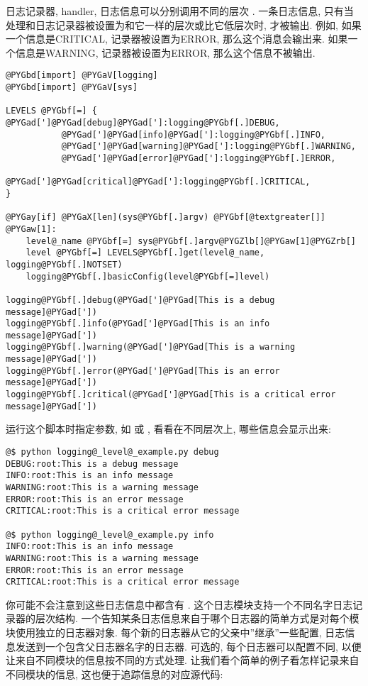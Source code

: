 \documentclass[letterpaper,10pt,english]{manual}
\begin{document}
日志记录器, handler, 日志信息可以分别调用不同的层次 . 一条日志信息, 只有当处理和日志记录器被设置为和它一样的层次或比它低层次时, 才被输出. 例如, 如果一个信息是CRITICAL, 记录器被设置为ERROR, 那么这个消息会输出来. 如果一个信息是WARNING, 记录器被设置为ERROR, 那么这个信息不被输出.

\begin{Verbatim}[commandchars=@\[\]]
@PYGbd[import] @PYGaV[logging]
@PYGbd[import] @PYGaV[sys]

LEVELS @PYGbf[=] { @PYGad[']@PYGad[debug]@PYGad[']:logging@PYGbf[.]DEBUG,
           @PYGad[']@PYGad[info]@PYGad[']:logging@PYGbf[.]INFO,
           @PYGad[']@PYGad[warning]@PYGad[']:logging@PYGbf[.]WARNING,
           @PYGad[']@PYGad[error]@PYGad[']:logging@PYGbf[.]ERROR,
           @PYGad[']@PYGad[critical]@PYGad[']:logging@PYGbf[.]CRITICAL,
}

@PYGay[if] @PYGaX[len](sys@PYGbf[.]argv) @PYGbf[@textgreater[]] @PYGaw[1]:
    level@_name @PYGbf[=] sys@PYGbf[.]argv@PYGZlb[]@PYGaw[1]@PYGZrb[]
    level @PYGbf[=] LEVELS@PYGbf[.]get(level@_name, logging@PYGbf[.]NOTSET)
    logging@PYGbf[.]basicConfig(level@PYGbf[=]level)

logging@PYGbf[.]debug(@PYGad[']@PYGad[This is a debug message]@PYGad['])
logging@PYGbf[.]info(@PYGad[']@PYGad[This is an info message]@PYGad['])
logging@PYGbf[.]warning(@PYGad[']@PYGad[This is a warning message]@PYGad['])
logging@PYGbf[.]error(@PYGad[']@PYGad[This is an error message]@PYGad['])
logging@PYGbf[.]critical(@PYGad[']@PYGad[This is a critical error message]@PYGad['])
\end{Verbatim}

运行这个脚本时指定参数, 如  或 , 看看在不同层次上, 哪些信息会显示出来:

\begin{Verbatim}[commandchars=@\[\]]
@$ python logging@_level@_example.py debug
DEBUG:root:This is a debug message
INFO:root:This is an info message
WARNING:root:This is a warning message
ERROR:root:This is an error message
CRITICAL:root:This is a critical error message

@$ python logging@_level@_example.py info
INFO:root:This is an info message
WARNING:root:This is a warning message
ERROR:root:This is an error message
CRITICAL:root:This is a critical error message
\end{Verbatim}

你可能不会注意到这些日志信息中都含有 . 这个日志模块支持一个不同名字日志记录器的层次结构. 一个告知某条日志信息来自于哪个日志器的简单方式是对每个模块使用独立的日志器对象. 每个新的日志器从它的父亲中''继承''一些配置, 日志信息发送到一个包含父日志器名字的日志器. 可选的, 每个日志器可以配置不同, 以便让来自不同模块的信息按不同的方式处理. 让我们看个简单的例子看怎样记录来自不同模块的信息, 这也便于追踪信息的对应源代码:
\end{document}
